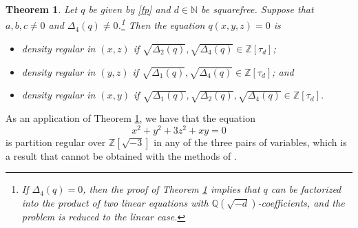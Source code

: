 \documentclass[11pt]{amsart}
\newtheorem{theorem}[lemma]{Theorem}
\newtheorem{corollary}[lemma]{Corollary}
\theoremstyle{definition}
\newcommand{\N}{{\mathbb N}}
\newcommand{\Q}{{\mathbb Q}}
\newcommand{\Z}{{\mathbb Z}}
\begin{document}


\fi


 
 


\begin{theorem}\label{th2density}
    Let $q$ be given by \eqref{fp} and $d\in\N$ be squarefree. 
     Suppose that $a,b,c\neq 0$ and $\Delta_{4}(q)\neq 0$.\footnote{If $\Delta_{4}(q)=0$, then the proof of Theorem \ref{th2density} implies that $q$ can be factorized into the product of two linear equations with $\Q(\sqrt{-d})$-coefficients, and the problem is reduced to the linear case.} Then the equation $q(x,y,z)=0$ is  
\begin{itemize}
    \item density regular in $(x,z)$ if $\sqrt{\Delta_{2}(q)},\sqrt{\Delta_{4}(q)}\in\Z[\tau_{d}]$;
    \item density regular in $(y,z)$ if $\sqrt{\Delta_{1}(q)},\sqrt{\Delta_{4}(q)}\in\Z[\tau_{d}]$; and
    \item density regular in $(x,y)$ if $\sqrt{\Delta_{1}(q)},\sqrt{\Delta_{2}(q)},\sqrt{\Delta_{4}(q)}\in\Z[\tau_{d}]$.
\end{itemize}
\end{theorem}

 As an application of Theorem \ref{th2density}, we have that the equation
$$x^{2}+y^{2}+3z^{2}+xy=0$$
is partition regular over $\Z[\sqrt{-3}]$ in any of the three pairs of variables, which is a result that cannot be obtained with the methods of \cite{S23}. 
\end{document}
